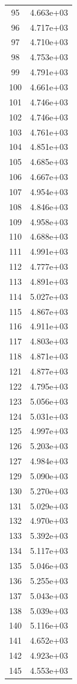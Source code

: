 \documentclass[12pt]{article}
\begin{document}
\begin{longtable}{@{}cc@{}}
95 & 4.663e+03 \\
96 & 4.717e+03 \\
97 & 4.710e+03 \\
98 & 4.753e+03 \\
99 & 4.791e+03 \\
100 & 4.661e+03 \\
101 & 4.746e+03 \\
102 & 4.746e+03 \\
103 & 4.761e+03 \\
104 & 4.851e+03 \\
105 & 4.685e+03 \\
106 & 4.667e+03 \\
107 & 4.954e+03 \\
108 & 4.846e+03 \\
109 & 4.958e+03 \\
110 & 4.688e+03 \\
111 & 4.991e+03 \\
112 & 4.777e+03 \\
113 & 4.891e+03 \\
114 & 5.027e+03 \\
115 & 4.867e+03 \\
116 & 4.911e+03 \\
117 & 4.803e+03 \\
118 & 4.871e+03 \\
121 & 4.877e+03 \\
122 & 4.795e+03 \\
123 & 5.056e+03 \\
124 & 5.031e+03 \\
125 & 4.997e+03 \\
126 & 5.203e+03 \\
127 & 4.984e+03 \\
129 & 5.090e+03 \\
130 & 5.270e+03 \\
131 & 5.029e+03 \\
132 & 4.970e+03 \\
133 & 5.392e+03 \\
134 & 5.117e+03 \\
135 & 5.046e+03 \\
136 & 5.255e+03 \\
137 & 5.043e+03 \\
138 & 5.039e+03 \\
140 & 5.116e+03 \\
141 & 4.652e+03 \\
142 & 4.923e+03 \\
145 & 4.553e+03 \\

\end{longtable}
\end{document}
